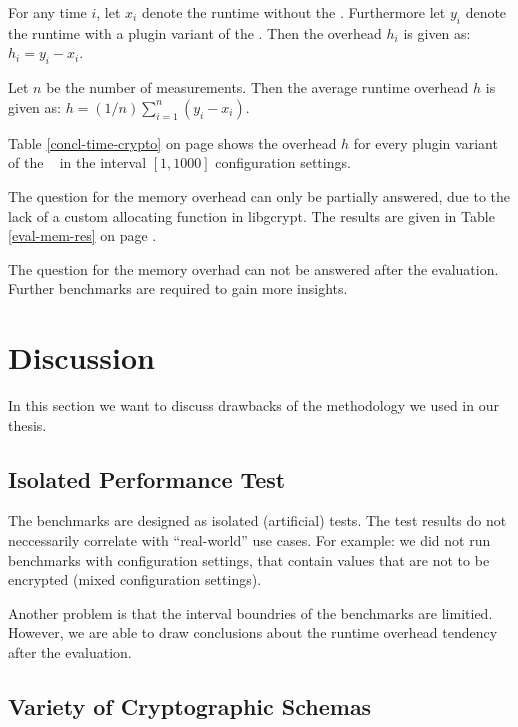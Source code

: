
For any time $i$, let $x_i$ denote the runtime without the \crypto.
Furthermore let $y_i$ denote the runtime with a plugin variant of the \crypto.
Then the overhead $h_i$ is given as: $h_i=y_i - x_i$.

Let $n$ be the number of measurements.
Then the average runtime overhead $h$ is given as: $h=(1/n) \sum_{i=1}^{n}(y_i - x_i)$.

Table \ref{concl-time-crypto} on page \pageref{concl-time-crypto} shows the overhead $h$ for every plugin variant of the \crypto~ in the interval $[1,1000]$ configuration settings.


The question for the memory overhead can only be partially answered, due to the lack of a custom allocating function in libgcrypt.
The results are given in Table \ref{eval-mem-res} on page \pageref{eval-mem-res}.



The question for the memory overhad can not be answered after the evaluation.
Further benchmarks are required to gain more insights.

\section{Discussion}

In this section we want to discuss drawbacks of the methodology we used in our thesis.

	\subsection{Isolated Performance Test}

The benchmarks are designed as isolated (artificial) tests.
The test results do not neccessarily correlate with ``real-world'' use cases.
For example: we did not run benchmarks with configuration settings, that contain values that are not to be encrypted (mixed configuration settings).

Another problem is that the interval boundries of the benchmarks are limitied.
However, we are able to draw conclusions about the runtime overhead tendency after the evaluation.

	\subsection{Variety of Cryptographic Schemas}

